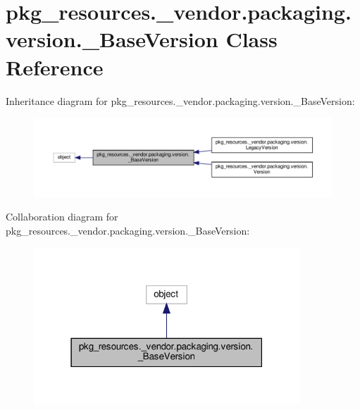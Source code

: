 \hypertarget{classpkg__resources_1_1__vendor_1_1packaging_1_1version_1_1__BaseVersion}{}\section{pkg\+\_\+resources.\+\_\+vendor.\+packaging.\+version.\+\_\+\+Base\+Version Class Reference}
\label{classpkg__resources_1_1__vendor_1_1packaging_1_1version_1_1__BaseVersion}


Inheritance diagram for pkg\+\_\+resources.\+\_\+vendor.\+packaging.\+version.\+\_\+\+Base\+Version\+:
\nopagebreak
\begin{figure}[H]
\begin{center}
\leavevmode
\includegraphics[width=350pt]{classpkg__resources_1_1__vendor_1_1packaging_1_1version_1_1__BaseVersion__inherit__graph}
\end{center}
\end{figure}


Collaboration diagram for pkg\+\_\+resources.\+\_\+vendor.\+packaging.\+version.\+\_\+\+Base\+Version\+:
\nopagebreak
\begin{figure}[H]
\begin{center}
\leavevmode
\includegraphics[width=283pt]{classpkg__resources_1_1__vendor_1_1packaging_1_1version_1_1__BaseVersion__coll__graph}
\end{center}
\end{figure}
